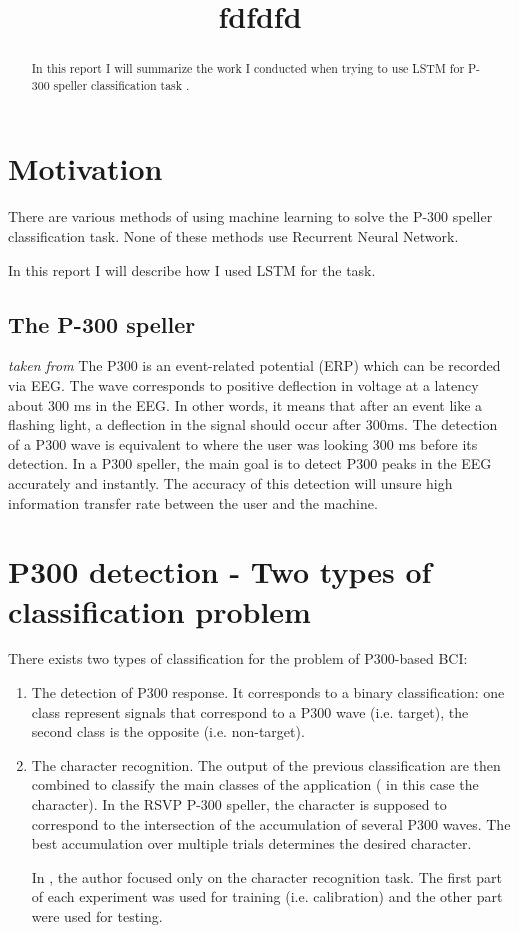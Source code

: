 \documentclass[]{report}
\title{fdfdfd}
\author{}
\begin{document}
\maketitle

\begin{abstract}
	In this report I will summarize the work I conducted when trying to use LSTM for  P-300 speller classification task .
\end{abstract}



\section{Motivation}
There are various methods of using machine learning to solve the P-300 speller classification task. None of these methods use Recurrent Neural Network.  

In this report I will describe how I used LSTM for the task.

\subsection{The P-300 speller }
\textit{taken from\cite{CNN_p300}}
The P300 is an event-related potential (ERP) which can be recorded via EEG. The wave corresponds to positive deflection in voltage at a latency about 300 ms in the EEG. In other words, it means that after an event like a flashing light, a deflection in the signal should occur after 300ms. The detection of a P300 wave is equivalent to where the user was looking 300 ms before its detection. In a P300 speller, the main goal is to detect P300 peaks in the EEG accurately and instantly. The accuracy of this detection will unsure high information transfer rate between the user and the machine.



\section{P300 detection - Two types of classification problem}
There exists two types of classification for the problem of P300-based BCI:
\begin{enumerate}
	\item The detection of P300 response. It corresponds to a binary classification: one class represent signals that correspond to a P300 wave (i.e. target), the second class is the opposite (i.e. non-target). 
	\item The character recognition. The output of the previous classification are then combined to classify the main classes of the application ( in this case the character). In the RSVP P-300 speller, the character is supposed to correspond to the intersection of the accumulation of several P300 waves. The best accumulation over multiple trials determines the desired character. 
	
In \cite{Blankertz}, the author focused only on the character recognition task. The first part of each experiment was used for training (i.e. calibration) and the other part were used for testing.

\end{enumerate}
\end{document}
